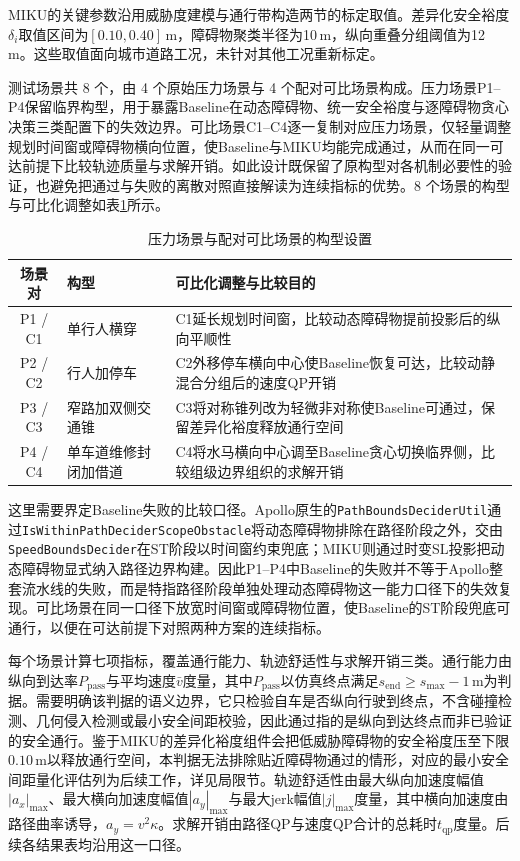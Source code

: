 \documentclass[a4paper,11pt]{ctexart}
\theoremstyle{definition}
\begin{document}
MIKU的关键参数沿用威胁度建模与通行带构造两节的标定取值。差异化安全裕度$\delta_i$取值区间为$[0.10, 0.40]$\,m，障碍物聚类半径为10\,m，纵向重叠分组阈值为12\,m。这些取值面向城市道路工况，未针对其他工况重新标定。

测试场景共 8 个，由 4 个原始压力场景与 4 个配对可比场景构成。压力场景P1--P4保留临界构型，用于暴露Baseline在动态障碍物、统一安全裕度与逐障碍物贪心决策三类配置下的失效边界。可比场景C1--C4逐一复制对应压力场景，仅轻量调整规划时间窗或障碍物横向位置，使Baseline与MIKU均能完成通过，从而在同一可达前提下比较轨迹质量与求解开销。如此设计既保留了原构型对各机制必要性的验证，也避免把通过与失败的离散对照直接解读为连续指标的优势。8 个场景的构型与可比化调整如表\ref{tab:exp_scenarios}所示。

\begin{table}[htbp]
\centering
\caption{压力场景与配对可比场景的构型设置}
\label{tab:exp_scenarios}
\small
\begin{tabular}{c l p{7.4cm}}
\toprule
\textbf{场景对} & \textbf{构型} & \textbf{可比化调整与比较目的} \\
\midrule
P1 / C1 & 单行人横穿 & C1延长规划时间窗，比较动态障碍物提前投影后的纵向平顺性 \\
P2 / C2 & 行人加停车 & C2外移停车横向中心使Baseline恢复可达，比较动静混合分组后的速度QP开销 \\
P3 / C3 & 窄路加双侧交通锥 & C3将对称锥列改为轻微非对称使Baseline可通过，保留差异化裕度释放通行空间 \\
P4 / C4 & 单车道维修封闭加借道 & C4将水马横向中心调至Baseline贪心切换临界侧，比较组级边界组织的求解开销 \\
\bottomrule
\end{tabular}
\end{table}

这里需要界定Baseline失败的比较口径。Apollo原生的\texttt{PathBoundsDeciderUtil}通过\texttt{IsWithinPathDeciderScopeObstacle}将动态障碍物排除在路径阶段之外，交由\texttt{SpeedBoundsDecider}在ST阶段以时间窗约束兜底；MIKU则通过时变SL投影把动态障碍物显式纳入路径边界构建。因此P1--P4中Baseline的失败并不等于Apollo整套流水线的失败，而是特指路径阶段单独处理动态障碍物这一能力口径下的失效复现。可比场景在同一口径下放宽时间窗或障碍物位置，使Baseline的ST阶段兜底可通行，以便在可达前提下对照两种方案的连续指标。

每个场景计算七项指标，覆盖通行能力、轨迹舒适性与求解开销三类。通行能力由纵向到达率$P_{\mathrm{pass}}$与平均速度$\bar v$度量，其中$P_{\mathrm{pass}}$以仿真终点满足$s_{\mathrm{end}} \geq s_{\max} - 1$\,m为判据。需要明确该判据的语义边界，它只检验自车是否纵向行驶到终点，不含碰撞检测、几何侵入检测或最小安全间距校验，因此通过指的是纵向到达终点而非已验证的安全通行。鉴于MIKU的差异化裕度组件会把低威胁障碍物的安全裕度压至下限$0.10$\,m以释放通行空间，本判据无法排除贴近障碍物通过的情形，对应的最小安全间距量化评估列为后续工作，详见局限节。轨迹舒适性由最大纵向加速度幅值$|a_x|_{\max}$、最大横向加速度幅值$|a_y|_{\max}$与最大jerk幅值$|j|_{\max}$度量，其中横向加速度由路径曲率诱导，$a_y = v^2 \kappa$。求解开销由路径QP与速度QP合计的总耗时$t_{\mathrm{qp}}$度量。后续各结果表均沿用这一口径。
\end{document}
